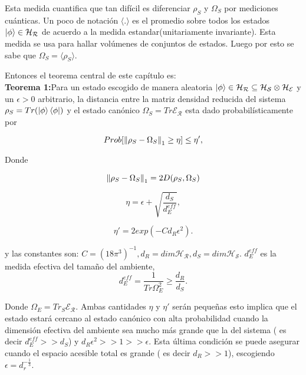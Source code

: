 Esta medida cuantifica que tan difícil es diferenciar $\rho_{S}$ y $\Omega_{S}$ por mediciones cuánticas. Un poco de notación $\langle . \rangle$ es el promedio sobre todos los estados $\ket{\phi} \in \mathcal{H_{R}}$ de acuerdo a la medida estandar(unitariamente invariante). Esta medida se usa para hallar volúmenes de conjuntos de estados. Luego por esto se sabe que $\Omega_{S} = \langle \rho_{S} \rangle $.

Entonces el teorema central de este capítulo es:\\

\textbf{Teorema 1:}Para un estado escogido de manera aleatoria $\ket{\phi} \in \mathcal{H_{R}} \subseteq \mathcal{H_{S}} \otimes \mathcal{H_{E}} $ y un $\epsilon > 0$ arbitrario, la distancia entre la matriz densidad reducida del sistema $\rho_{S}=Tr(\ket{\phi} \bra{\phi})$  y el estado canónico $\Omega_{S}=Tr \mathcal{E_{R}}$ esta dado probabilísticamente por 

\begin{equation}
Prob[  \norm{\rho_{S} -\Omega_{S}}_{1} \geq \eta ] \leq \eta',
\end{equation}

Donde 

\begin{equation}
\norm{\rho_{S}-\Omega_{S}}_{1}=2 D(\rho_{S}, \Omega_{S})
\end{equation}

\begin{equation}
\eta= \epsilon + \sqrt{ \frac{d_{S}}{d_{E}^{eff}} },
\end{equation}

\begin{equation}
\eta'=2exp(-Cd_{R}\epsilon^{2}).
\end{equation}

y las constantes son: $ C=(18\pi^{3})^{-1}, d_{R} = dim \mathcal{H_{R}}, d_{S} = dim \mathcal{H_{S}} $. $d_{E}^{eff}$ es la medida efectiva del tamaño del ambiente,
\begin{equation}
d_{E}^{eff}= \frac{1}{Tr \Omega_{E}^{2}} \ge \frac{d_{R}}{d_{S}}.
\end{equation}

Donde $\Omega_{E}= Tr_{S} \mathcal{E_{R}}$. Ambas cantidades $\eta $ y $\eta'$ serán pequeñas esto implica que el estado estará cercano al estado canónico con alta probabilidad cuando la dimensión efectiva del ambiente sea mucho más grande que la del sistema ( es decir $d_{E}^{eff} >> d_{S}$) y  $d_{R}\epsilon^2>>1>>\epsilon$. Esta última condición se puede asegurar cuando el espacio acesible total es grande ( es decir $d_{R}>>1$), escogiendo $\epsilon=d_{r}^{-\frac{1}{3}}$.\\

